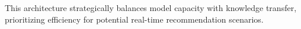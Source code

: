 %
This architecture strategically balances model capacity with knowledge transfer, prioritizing efficiency for potential real-time recommendation scenarios.

